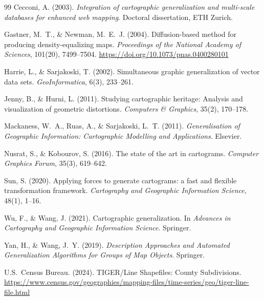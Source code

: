 \documentclass[12pt, a4paper]{article}
\numberwithin{equation}{section}
\begin{document}
\begin{thebibliography}{99}
Cecconi, A. (2003).
\textit{Integration of cartographic generalization and multi-scale databases
for enhanced web mapping}.
Doctoral dissertation, ETH Zurich.

Gastner, M.~T., \& Newman, M.~E.~J. (2004).
Diffusion-based method for producing density-equalizing maps.
\textit{Proceedings of the National Academy of Sciences}, 101(20), 7499--7504.
\url{https://doi.org/10.1073/pnas.0400280101}

Harrie, L., \& Sarjakoski, T. (2002).
Simultaneous graphic generalization of vector data sets.
\textit{GeoInformatica}, 6(3), 233--261.

Jenny, B., \& Hurni, L. (2011).
Studying cartographic heritage: Analysis and visualization of geometric
distortions.
\textit{Computers \& Graphics}, 35(2), 170--178.

Mackaness, W.~A., Ruas, A., \& Sarjakoski, L.~T. (2011).
\textit{Generalisation of Geographic Information: Cartographic Modelling and
Applications}.
Elsevier.

Nusrat, S., \& Kobourov, S. (2016).
The state of the art in cartograms.
\textit{Computer Graphics Forum}, 35(3), 619--642.

Sun, S. (2020).
Applying forces to generate cartograms: a fast and flexible transformation
framework.
\textit{Cartography and Geographic Information Science}, 48(1), 1--16.

Wu, F., \& Wang, J. (2021).
Cartographic generalization.
In \textit{Advances in Cartography and Geographic Information Science}.
Springer.

Yan, H., \& Wang, J.~Y. (2019).
\textit{Description Approaches and Automated Generalization Algorithms for
Groups of Map Objects}.
Springer.

U.S.\ Census Bureau. (2024).
TIGER/Line Shapefiles: County Subdivisions.
\url{https://www.census.gov/geographies/mapping-files/time-series/geo/tiger-line-file.html}

\end{thebibliography}
\end{document}
